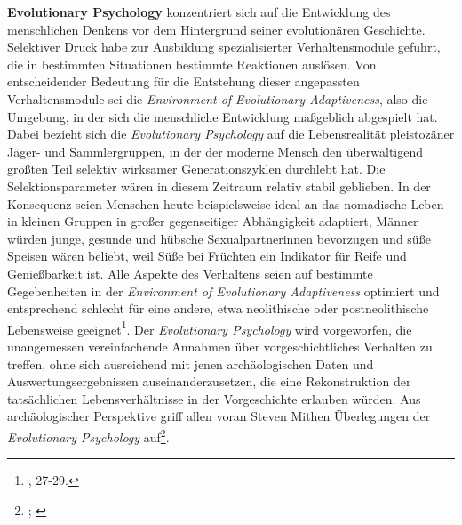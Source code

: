 \documentclass[openany,twoside,twocolumn]{book}
\let\rmarkdownfootnote\footnote%
\def\footnote{\protect\rmarkdownfootnote}
\begin{document}
\textbf{Evolutionary Psychology} konzentriert sich auf die Entwicklung des menschlichen Denkens vor dem Hintergrund seiner evolutionären Geschichte. Selektiver Druck habe zur Ausbildung spezialisierter Verhaltensmodule geführt, die in bestimmten Situationen bestimmte Reaktionen auslösen. Von entscheidender Bedeutung für die Entstehung dieser angepassten Verhaltensmodule sei die \emph{Environment of Evolutionary Adaptiveness}, also die Umgebung, in der sich die menschliche Entwicklung maßgeblich abgespielt hat. Dabei bezieht sich die \emph{Evolutionary Psychology} auf die Lebensrealität pleistozäner Jäger- und Sammlergruppen, in der der moderne Mensch den überwältigend größten Teil selektiv wirksamer Generationszyklen durchlebt hat. Die Selektionsparameter wären in diesem Zeitraum relativ stabil geblieben. In der Konsequenz seien Menschen heute beispielsweise ideal an das nomadische Leben in kleinen Gruppen in großer gegenseitiger Abhängigkeit adaptiert, Männer würden junge, gesunde und hübsche Sexualpartnerinnen bevorzugen und süße Speisen wären beliebt, weil Süße bei Früchten ein Indikator für Reife und Genießbarkeit ist. Alle Aspekte des Verhaltens seien auf bestimmte Gegebenheiten in der \emph{Environment of Evolutionary Adaptiveness} optimiert und entsprechend schlecht für eine andere, etwa neolithische oder postneolithische Lebensweise geeignet\footnote{\textcite{SmithThreestylesevolutionary2000}, 27-29.}. Der \emph{Evolutionary Psychology} wird vorgeworfen, die unangemessen vereinfachende Annahmen über vorgeschichtliches Verhalten zu treffen, ohne sich ausreichend mit jenen archäologischen Daten und Auswertungsergebnissen auseinanderzusetzen, die eine Rekonstruktion der tatsächlichen Lebensverhältnisse in der Vorgeschichte erlauben würden. Aus archäologischer Perspektive griff allen voran Steven Mithen Überlegungen der \emph{Evolutionary Psychology} auf\footnote{\textcite{Mithenprehistorymindsearch1996}; \textcite{mithen_cognitive_1997}}.
\end{document}
